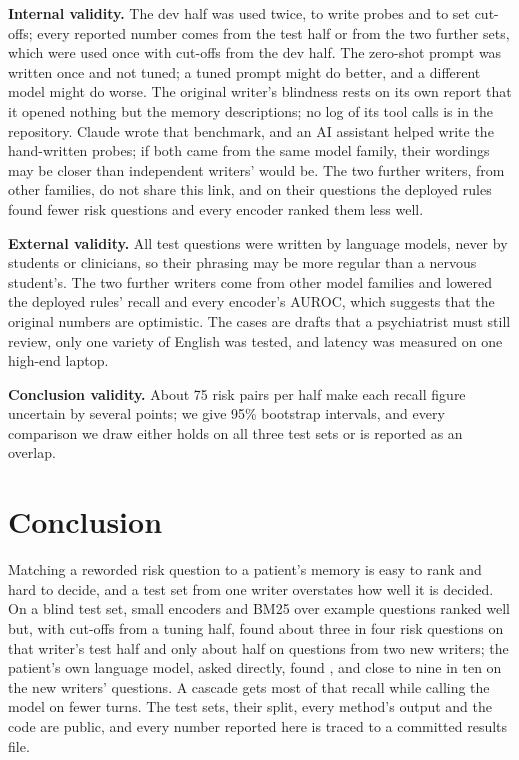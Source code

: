 \documentclass[sn-mathphys-num]{sn-jnl}
\begin{document}
\textbf{Internal validity.} The dev half was used twice, to write probes and to set cut-offs; every reported number comes from the test half
or from the two further sets, which were used once with cut-offs from the dev half. The zero-shot prompt was written once and not tuned; a
tuned prompt might do better, and a different model might do worse. The original writer's blindness rests on its own report that it
opened nothing but the memory descriptions; no log of its tool calls is in the repository. Claude wrote that benchmark, and an AI assistant
helped write the hand-written probes; if both came from the same model family, their wordings may be closer than independent writers'
would be. The two further writers, from other families, do not share this link, and on their questions the deployed rules found fewer
risk questions and every encoder ranked them less well.

\textbf{External validity.} All test questions were written by language models, never by students or clinicians, so their phrasing may be
more regular than a nervous student's. The two further writers come from other model families and lowered the deployed rules' recall and every encoder's AUROC, which
suggests that the original numbers are optimistic. The cases are drafts that a psychiatrist must still review, only one variety of English
was tested, and latency was measured on one high-end laptop.

\textbf{Conclusion validity.} About 75 risk pairs per half make each recall figure uncertain by several points; we give 95\% bootstrap
intervals, and every comparison we draw either holds on all three test sets or is reported as an overlap.

\section{Conclusion}
Matching a reworded risk question to a patient's memory is easy to rank and hard to decide, and a test set from one writer overstates how
well it is decided. On a blind test set, small encoders and BM25 over
example questions ranked well but, with cut-offs from a tuning half, found about three in four risk questions on that writer's test half and
only about half on questions from two new writers; the patient's own language model, asked directly, found \numLLMrisk{}, and close to nine in
ten on the new writers' questions. A cascade gets most of that recall while calling the model on fewer turns. The test sets, their split, every method's output and the code
are public, and every number reported here is traced to a committed results file.
\end{document}
